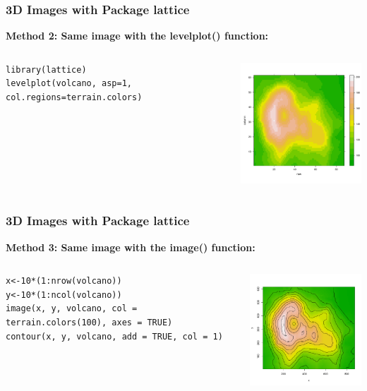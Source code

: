 \begin{frame}[fragile]
\frametitle{3D Images with Package \ttfamily lattice \normalfont}

\bf{Method 2:} \normalfont Same image with the \ttfamily levelplot() \normalfont function:

    \begin{columns}
\begin{lstlisting}
library(lattice)
levelplot(volcano, asp=1, col.regions=terrain.colors)
\end{lstlisting}

       \begin{center}
\includegraphics[width = 55mm]{images/levelplot.pdf}
\end{center}
\end{columns}
\end{frame}

\begin{frame}[fragile]
\frametitle{3D Images with Package \ttfamily lattice \normalfont}

\bf{Method 3:} \normalfont Same image with the \ttfamily image() \normalfont function:
    \begin{columns}
      
\begin{lstlisting}
x<-10*(1:nrow(volcano))
y<-10*(1:ncol(volcano))
image(x, y, volcano, col = terrain.colors(100), axes = TRUE)
contour(x, y, volcano, add = TRUE, col = 1)
\end{lstlisting}

       \begin{center}
\includegraphics[width = 55mm]{images/image.pdf}
\end{center}
\end{columns}
\end{frame}

